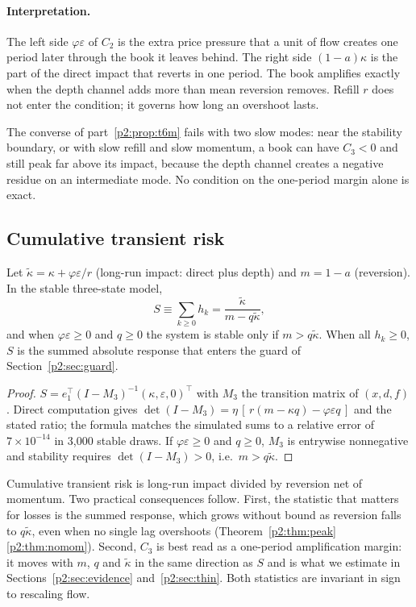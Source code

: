 \paragraph{Interpretation.} The left side $\varphi\varepsilon$ of $C_2$ is the extra price pressure that a unit of flow creates one period later through the book it leaves behind. The right side $(1-a)\kappa$ is the part of the direct impact that reverts in one period. The book amplifies exactly when the depth channel adds more than mean reversion removes. Refill $r$ does not enter the condition; it governs how long an overshoot lasts.

    The converse of part~\ref{p2:prop:t6m} fails with two slow modes: near the stability boundary, or with slow refill and slow momentum, a book can have $C_3<0$ and still peak far above its impact, because the depth channel creates a negative residue on an intermediate mode. No condition on the one-period margin alone is exact.

    \subsection{Cumulative transient risk}
\begin{theorem}\label{p2:thm:sum}
Let $\tilde\kappa=\kappa+\varphi\varepsilon/r$ (long-run impact: direct plus depth) and $m=1-a$ (reversion). In the stable three-state model,
\[
S\equiv\sum_{k\ge0}h_k=\frac{\tilde\kappa}{m-q\tilde\kappa},
\]
and when $\varphi\varepsilon\ge0$ and $q\ge0$ the system is stable only if $m>q\tilde\kappa$. When all $h_k\ge0$, $S$ is the summed absolute response that enters the guard of Section~\ref{p2:sec:guard}.
\end{theorem}

\begin{proof}
$S=e_1^\top(I-M_3)^{-1}(\kappa,\varepsilon,0)^\top$ with $M_3$ the transition matrix of $(x,d,f)$. Direct computation gives $\det(I-M_3)=\eta\,[\,r(m-\kappa q)-\varphi\varepsilon q\,]$ and the stated ratio; the formula matches the simulated sums to a relative error of $7\times10^{-14}$ in 3{,}000 stable draws. If $\varphi\varepsilon\ge0$ and $q\ge0$, $M_3$ is entrywise nonnegative and stability requires $\det(I-M_3)>0$, i.e.\ $m>q\tilde\kappa$.
\end{proof}

Cumulative transient risk is long-run impact divided by reversion net of momentum. Two practical consequences follow. First, the statistic that matters for losses is the summed response, which grows without bound as reversion falls to $q\tilde\kappa$, even when no single lag overshoots (Theorem~\ref{p2:thm:peak}\ref{p2:thm:nomom}). Second, $C_3$ is best read as a one-period amplification margin: it moves with $m$, $q$ and $\tilde\kappa$ in the same direction as $S$ and is what we estimate in Sections~\ref{p2:sec:evidence} and~\ref{p2:sec:thin}. Both statistics are invariant in sign to rescaling flow.

